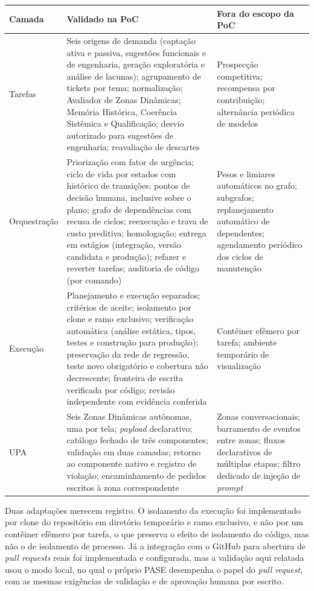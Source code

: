 \begin{quadro}[htb]
\centering
\caption{Componentes validados na PoC e escopo remanescente}
\label{quadro:3}
\footnotesize
\renewcommand{\arraystretch}{1.25}
\begin{tabularx}{\textwidth}{|X|X|X|}
\hline
\textbf{Camada} & \textbf{Validado na PoC} & \textbf{Fora do escopo da PoC} \\
\hline
Tarefas & Seis origens de demanda (captação ativa e passiva, sugestões funcionais e de engenharia, geração exploratória e análise de lacunas); agrupamento de tickets por tema; normalização; Avaliador de Zonas Dinâmicas; Memória Histórica, Coerência Sistêmica e Qualificação; desvio autorizado para sugestões de engenharia; reavaliação de descartes & Prospecção competitiva; recompensa por contribuição; alternância periódica de modelos \\
\hline
Orquestração & Priorização com fator de urgência; ciclo de vida por estados com histórico de transições; pontos de decisão humana, inclusive sobre o plano; grafo de dependências com recusa de ciclos; reexecução e trava de custo preditiva; homologação; entrega em estágios (integração, versão candidata e produção); refazer e reverter tarefas; auditoria de código (por comando) & Pesos e limiares automáticos no grafo; subgrafos; replanejamento automático de dependentes; agendamento periódico dos ciclos de manutenção \\
\hline
Execução & Planejamento e execução separados; critérios de aceite; isolamento por clone e ramo exclusivo; verificação automática (análise estática, tipos, testes e construção para produção); preservação da rede de regressão, teste novo obrigatório e cobertura não decrescente; fronteira de escrita verificada por código; revisão independente com evidência conferida & Contêiner efêmero por tarefa; ambiente temporário de visualização \\
\hline
UPA & Seis Zonas Dinâmicas autônomas, uma por tela; \textit{payload} declarativo; catálogo fechado de três componentes; validação em duas camadas; retorno ao componente nativo e registro de violação; encaminhamento de pedidos escritos à zona correspondente & Zonas conversacionais; barramento de eventos entre zonas; fluxos declarativos de múltiplas etapas; filtro dedicado de injeção de \textit{prompt} \\
\hline
\end{tabularx}
\end{quadro}

Duas adaptações merecem registro. O isolamento da execução foi implementado por clone do repositório em diretório temporário e ramo exclusivo, e não por um contêiner efêmero por tarefa, o que preserva o efeito de isolamento do código, mas não o de isolamento de processo. Já a integração com o GitHub para abertura de \textit{pull requests} reais foi implementada e configurada, mas a validação aqui relatada usou o modo local, no qual o próprio PASE desempenha o papel do \textit{pull request}, com as mesmas exigências de validação e de aprovação humana por escrito.

